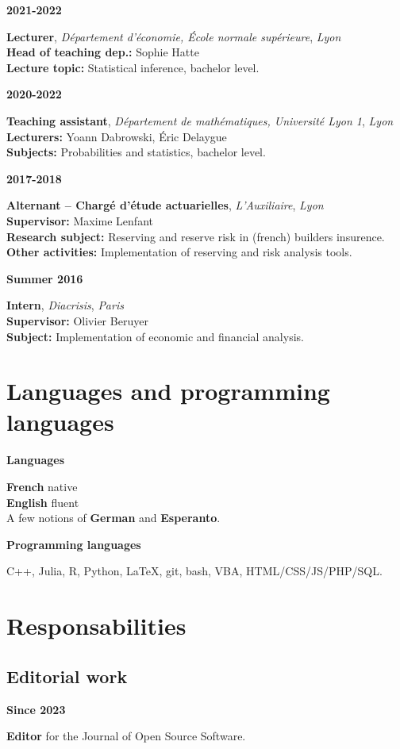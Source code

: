 \documentclass[a4paper,11pt]{article}
\newcommand{\tabcv}[2]{
\begin{minipage}[t]{0.12\linewidth}
\textbf{\footnotesize #1}
\end{minipage}\hfill
\begin{minipage}[t]{0.85\linewidth}
#2
\end{minipage}
\vspace{1em}
}
\newcommand{\bull}[1]{\textbf{#1}}
\begin{document}
\tabcv{2021-2022}{
\textbf{Lecturer}, \textit{Département d'économie, École normale supérieure}, \textit{Lyon}\\[0.5em]
{\footnotesize
  \bull{Head of teaching dep.:} Sophie Hatte\\
  \bull{Lecture topic:} Statistical inference, bachelor level.\\
}
}

\tabcv{2020-2022}{
\textbf{Teaching assistant}, \textit{Département de mathématiques, Université Lyon 1}, \textit{Lyon}\\[0.5em]
{\footnotesize
  \bull{Lecturers:} Yoann Dabrowski, Éric Delaygue\\
  \bull{Subjects:} Probabilities and statistics, bachelor level.\\
}
}

\tabcv{2017-2018}{
\textbf{Alternant -- Chargé d'étude actuarielles}, \textit{L'Auxiliaire}, \textit{Lyon}\\[0.5em]
{\footnotesize
  \bull{Supervisor:} Maxime Lenfant\\
  \bull{Research subject:} Reserving and reserve risk in (french) builders insurence.\\
  \bull{Other activities:} Implementation of reserving and risk analysis tools.\\
}
}


\tabcv{Summer 2016}{
\textbf{Intern}, \textit{Diacrisis}, \textit{Paris}\\[0.5em]
{\footnotesize
  \bull{Supervisor:} Olivier Beruyer\\
  \bull{Subject:} Implementation of economic and financial analysis. \\
}
}

\section{Languages and programming languages}
\tabcv{Languages}{
  \textbf{French} native\\ 
  \textbf{English} fluent\\ 
  A few notions of \textbf{German} and \textbf{Esperanto}.\\
}
\tabcv{Programming languages}{C++, Julia, R, Python, \LaTeX, git, bash, VBA, HTML/CSS/JS/PHP/SQL.}

\section{Responsabilities}

\subsection{Editorial work}
\tabcv{Since 2023}{\textbf{Editor} for the {{Journal of Open Source Software}}.}
\end{document}
